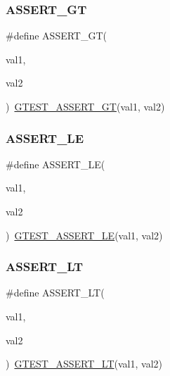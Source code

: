 \mbox{\label{_obj__test_2lib_2googletest-master_2googletest_2include_2gtest_2gtest_8h_a16a882d4eafc9f8643867aea40879140}} 
\subsubsection{\texorpdfstring{ASSERT\_GT}{ASSERT\_GT}}
{\footnotesize\ttfamily \#define A\+S\+S\+E\+R\+T\+\_\+\+GT(\begin{DoxyParamCaption}\item[{}]{val1,  }\item[{}]{val2 }\end{DoxyParamCaption})~\mbox{\hyperlink{_obj__test_2lib_2googletest-release-1_88_81_2googletest_2include_2gtest_2gtest_8h_a088b9056fd1c1f316b41c22f64deb33a}{G\+T\+E\+S\+T\+\_\+\+A\+S\+S\+E\+R\+T\+\_\+\+GT}}(val1, val2)}

\mbox{\label{_obj__test_2lib_2googletest-master_2googletest_2include_2gtest_2gtest_8h_a775643748feff0b490aae651d041e971}} 
\subsubsection{\texorpdfstring{ASSERT\_LE}{ASSERT\_LE}}
{\footnotesize\ttfamily \#define A\+S\+S\+E\+R\+T\+\_\+\+LE(\begin{DoxyParamCaption}\item[{}]{val1,  }\item[{}]{val2 }\end{DoxyParamCaption})~\mbox{\hyperlink{_obj__test_2lib_2googletest-release-1_88_81_2googletest_2include_2gtest_2gtest_8h_abef04dcd4a0259d378de7b3b3ffb6730}{G\+T\+E\+S\+T\+\_\+\+A\+S\+S\+E\+R\+T\+\_\+\+LE}}(val1, val2)}

\mbox{\label{_obj__test_2lib_2googletest-master_2googletest_2include_2gtest_2gtest_8h_affc4f9cae4c3aabfe60fced83737b42c}} 
\subsubsection{\texorpdfstring{ASSERT\_LT}{ASSERT\_LT}}
{\footnotesize\ttfamily \#define A\+S\+S\+E\+R\+T\+\_\+\+LT(\begin{DoxyParamCaption}\item[{}]{val1,  }\item[{}]{val2 }\end{DoxyParamCaption})~\mbox{\hyperlink{_obj__test_2lib_2googletest-release-1_88_81_2googletest_2include_2gtest_2gtest_8h_a5a75667e637febd18e5f7d4f3abf55e8}{G\+T\+E\+S\+T\+\_\+\+A\+S\+S\+E\+R\+T\+\_\+\+LT}}(val1, val2)}


